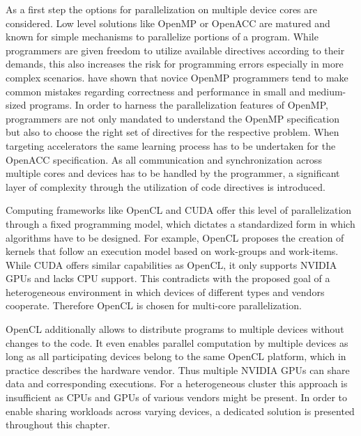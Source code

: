 As a first step the options for parallelization on multiple device cores are considered. Low level solutions like OpenMP or OpenACC are matured and known for simple mechanisms to parallelize portions of a program. While programmers are given freedom to utilize available directives according to their demands, this also increases the risk for programming errors especially in more complex scenarios. \citeauthor{openmp_mistakes} have shown that novice OpenMP programmers tend to make common mistakes regarding correctness and performance in small and medium-sized programs\cite{openmp_mistakes}. In order to harness the parallelization features of OpenMP, programmers are not only mandated to understand the OpenMP specification but also to choose the right set of directives for the respective problem. When targeting accelerators the same learning process has to be undertaken for the OpenACC specification. As all communication and synchronization across multiple cores and devices has to be handled by the programmer, a significant layer of complexity through the utilization of code directives is introduced.

Computing frameworks like OpenCL and CUDA offer this level of parallelization through a fixed programming model, which dictates a standardized form in which algorithms have to be designed. For example, OpenCL proposes the creation of kernels that follow an execution model based on work-groups and work-items. While CUDA offers similar capabilities as OpenCL, it only supports NVIDIA GPUs and lacks CPU support. This contradicts with the proposed goal of a heterogeneous environment in which devices of different types and vendors cooperate. Therefore OpenCL is chosen for multi-core parallelization.

OpenCL additionally allows to distribute programs to multiple devices without changes to the code. It even enables parallel computation by multiple devices as long as all participating devices belong to the same OpenCL platform, which in practice describes the hardware vendor. Thus multiple NVIDIA GPUs can share data and corresponding executions. For a heterogeneous cluster this approach is insufficient as CPUs and GPUs of various vendors might be present. In order to enable sharing workloads across varying devices, a dedicated solution is presented throughout this chapter.

